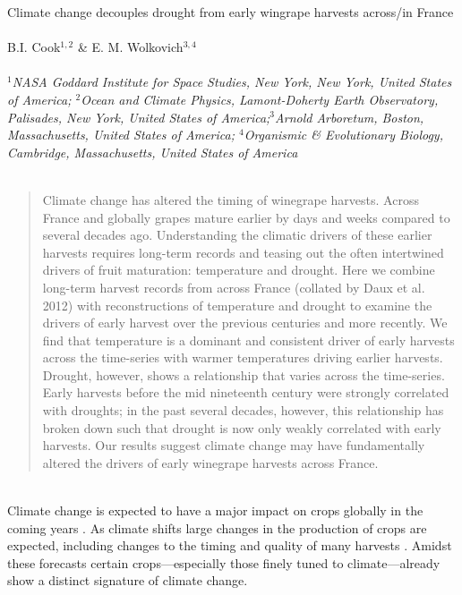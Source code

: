 \documentclass[11pt,a4paper,oneside]{article}
\begin{document}


 Climate change decouples drought from early wingrape harvests across/in France\\
\\
 B.I. Cook\(^{1,2}\) \& E. M. Wolkovich\(^{3, 4}\)\\
\\
\noindent \emph{$^{1}$NASA Goddard Institute for Space Studies, New York, New York, United States of America; $^{2}$Ocean and Climate Physics, Lamont-Doherty Earth Observatory, Palisades, New York, United States of America;$^{3}$Arnold Arboretum, Boston, Massachusetts, United States of America; $^{4}$Organismic \& Evolutionary Biology, Cambridge, Massachusetts, United States of America} \\
\\
\begin{abstract}
Climate change has altered the timing of winegrape harvests. Across France and globally grapes mature earlier by days and weeks compared to several decades ago. Understanding the climatic drivers of these earlier harvests requires long-term records and teasing out the often intertwined drivers of fruit maturation: temperature and drought. Here we combine long-term harvest records from across France (collated by Daux et al. 2012) with reconstructions of temperature and drought to examine the drivers of early harvest over the previous centuries and more recently. We find that temperature is a dominant and consistent driver of early harvests across the time-series with warmer temperatures driving earlier harvests. Drought, however, shows a relationship that varies across the time-series. Early harvests before the mid nineteenth century were strongly correlated with droughts; in the past several decades, however, this relationship has broken down such that drought is now only weakly correlated with early harvests. Our results suggest climate change may have fundamentally altered the drivers of early winegrape harvests across France.
\end{abstract}

\newpage
{}\\



Climate change is expected to have a major impact on crops globally in the coming years \citep{IPCC:2014uq}. As climate shifts large changes in the production of crops are expected, including changes to the timing and quality of many harvests \citep{sacks2010,wang2011,rosen2014}. Amidst these forecasts certain crops---especially those finely tuned to climate---already show a distinct signature of climate change.\\
\end{document}

